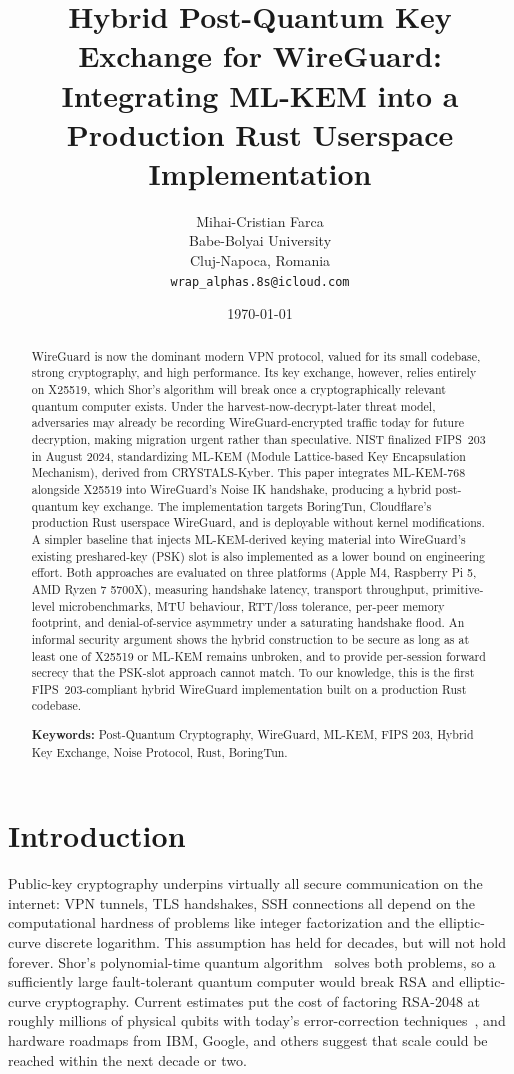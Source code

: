 \documentclass[11pt,a4paper]{article}
\title{\textbf{Hybrid Post-Quantum Key Exchange for WireGuard:\\
Integrating ML-KEM into a Production Rust Userspace Implementation}}
\author{
  Mihai-Cristian Farca\textcommabelow{s}\\
  Babe\textcommabelow{s}-Bolyai University\\
  Cluj-Napoca, Romania\\
  \texttt{wrap\_alphas.8s@icloud.com}
}
\date{\today}
\begin{document}
\maketitle

\begin{abstract}
WireGuard is now the dominant modern VPN protocol, valued for its small codebase, strong cryptography, and high performance. Its key exchange, however, relies entirely on X25519, which Shor's algorithm will break once a cryptographically relevant quantum computer exists. Under the harvest-now-decrypt-later threat model, adversaries may already be recording WireGuard-encrypted traffic today for future decryption, making migration urgent rather than speculative. NIST finalized FIPS~203 in August 2024, standardizing ML-KEM (Module Lattice-based Key Encapsulation Mechanism), derived from CRYSTALS-Kyber. This paper integrates ML-KEM-768 alongside X25519 into WireGuard's Noise IK handshake, producing a hybrid post-quantum key exchange. The implementation targets BoringTun, Cloudflare's production Rust userspace WireGuard, and is deployable without kernel modifications. A simpler baseline that injects ML-KEM-derived keying material into WireGuard's existing preshared-key (PSK) slot is also implemented as a lower bound on engineering effort. Both approaches are evaluated on three platforms (Apple M4, Raspberry Pi 5, AMD Ryzen 7 5700X), measuring handshake latency, transport throughput, primitive-level microbenchmarks, MTU behaviour, RTT/loss tolerance, per-peer memory footprint, and denial-of-service asymmetry under a saturating handshake flood. An informal security argument shows the hybrid construction to be secure as long as at least one of X25519 or ML-KEM remains unbroken, and to provide per-session forward secrecy that the PSK-slot approach cannot match. To our knowledge, this is the first FIPS~203-compliant hybrid WireGuard implementation built on a production Rust codebase.

\vspace{0.5em}
\noindent\textbf{Keywords:} Post-Quantum Cryptography, WireGuard, ML-KEM, FIPS 203, Hybrid Key Exchange, Noise Protocol, Rust, BoringTun.
\end{abstract}

\section{Introduction}
\label{sec:introduction}

Public-key cryptography underpins virtually all secure communication on the internet: VPN tunnels, TLS handshakes, SSH connections all depend on the computational hardness of problems like integer factorization and the elliptic-curve discrete logarithm. This assumption has held for decades, but will not hold forever. Shor's polynomial-time quantum algorithm~\cite{shor1994algorithms} solves both problems, so a sufficiently large fault-tolerant quantum computer would break RSA and elliptic-curve cryptography. Current estimates put the cost of factoring RSA-2048 at roughly millions of physical qubits with today's error-correction techniques~\cite{gidney2021factor}, and hardware roadmaps from IBM, Google, and others suggest that scale could be reached within the next decade or two.
\end{document}
